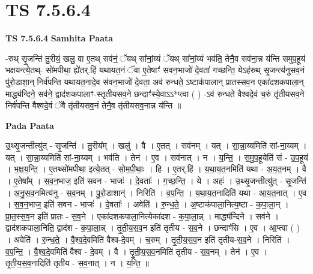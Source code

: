 \documentclass[17pt]{extarticle}
\begin{document}

\section{ TS 7.5.6.4 }

\textbf{TS 7.5.6.4 } \newline
\textbf{Samhita Paata} \newline

-रुथ् सृ॒जन्ति॑ तु॒रीयं॒ खलु॒ वा ए॒तथ् सव॑नं॒ ॅयथ् सा᳚नां॒य्यं ॅयथ् सा᳚नां॒य्यं भव॑ति॒ तेनै॒व सव॑ना॒न्न य॑न्ति समुप॒हूय॑ भक्षयन्त्ये॒तथ्- सो॑मपीथा॒ ह्ये॑तर्.हि॑ यथायत॒नं ॅवा ए॒तेषाꣳ॑ सवन॒भाजो॑ दे॒वता॑ गच्छन्ति॒ येऽह॑रुथ् सृ॒जन्त्य॑नुसव॒नं पु॑रो॒डाशा॒न् निर्व॑पन्ति यथायत॒नादे॒व स॑वन॒भाजो॑ दे॒वता॒ अव॑ रुन्धते॒ ऽष्टाक॑पालान् प्रातस्सव॒न एका॑दशकपाला॒न् माद्ध्य॑न्दिने॒ सव॑ने॒ द्वाद॑शकपालाꣳ-स्तृतीयसव॒ने छन्दाꣳ॑स्ये॒वाऽऽ*प्त्वा ( ) -ऽव॑ रुन्धते वैश्वदे॒वं च॒रुं तृ॑तीयसव॒ने निर्व॑पन्ति वैश्वदे॒वं ॅवै तृ॑तीयसव॒नं तेनै॒व तृ॑तीयसव॒नान्न य॑न्ति ॥ \newline

\textbf{Pada Paata} \newline

उ॒थ्सृ॒जन्तीत्यु॑त् - सृ॒जन्ति॑ । तु॒रीय᳚म् । खलु॑ । वै । ए॒तत् । सव॑नम् । यत् । सा॒न्ना॒य्यमिति॑ सां-ना॒य्यम् । यत् । सा॒न्ना॒य्यमिति॑ सां-ना॒य्यम् । भव॑ति । तेन॑ । ए॒व । सव॑नात् । न । य॒न्ति॒ । स॒मु॒प॒हूयेति॑ सं - उ॒प॒हूय॑ । भ॒क्ष॒य॒न्ति॒ । ए॒तथ्सो॑मपीथा॒ इत्ये॒तत् - सो॒म॒पी॒थाः॒ । हि । ए॒तर्.हि॑ । य॒था॒य॒त॒नमिति॑ यथा - अ॒य॒त॒नम् । वै । ए॒तेषा᳚म् । स॒व॒न॒भाज॒ इति॑ सवन - भाजः॑ । दे॒वताः᳚ । ग॒च्छ॒न्ति॒ । ये । अहः॑ । उ॒थ्सृ॒जन्तीत्यु॑त् - सृ॒जन्ति॑ । अ॒नु॒स॒व॒नमित्य॑नु - स॒व॒नम् । पु॒रो॒डाशान्॑ । निरिति॑ । व॒प॒न्ति॒ । य॒था॒य॒त॒नादिति॑ यथा - आ॒य॒त॒नात् । ए॒व । स॒व॒न॒भाज॒ इति॑ सवन - भाजः॑ । दे॒वताः᳚ । अवेति॑ । रु॒न्ध॒ते॒ । अ॒ष्टाक॑पाला॒नित्य॒ष्टा - क॒पा॒ला॒न् । प्रा॒त॒स्स॒व॒न इति॑ प्रातः - स॒व॒ने । एका॑दशकपाला॒नित्येका॑दश - क॒पा॒ला॒न्न् । माद्ध्य॑न्दिने । सव॑ने । द्वाद॑शकपाला॒निति॒ द्वाद॑श - क॒पा॒ला॒न्न् । तृ॒ती॒य॒स॒व॒न इति॑ तृतीय - स॒व॒ने । छन्दाꣳ॑सि । ए॒व । आ॒प्त्वा ( ) । अवेति॑ । रु॒न्ध॒ते॒ । वै॒श्व॒दे॒वमिति॑ वैश्व-दे॒वम् । च॒रुम् । तृ॒ती॒य॒स॒व॒न इति॑ तृतीय-स॒व॒ने । निरिति॑ । व॒प॒न्ति॒ । वै॒श्व॒दे॒वमिति॑ वैश्व - दे॒वम् । वै । तृ॒ती॒य॒स॒व॒नमिति॑ तृतीय - स॒व॒नम् । तेन॑ । ए॒व । तृ॒ती॒य॒स॒व॒नादिति॑ तृतीय - स॒व॒नात् । न । य॒न्ति॒ ॥  \newline




\end{document}
